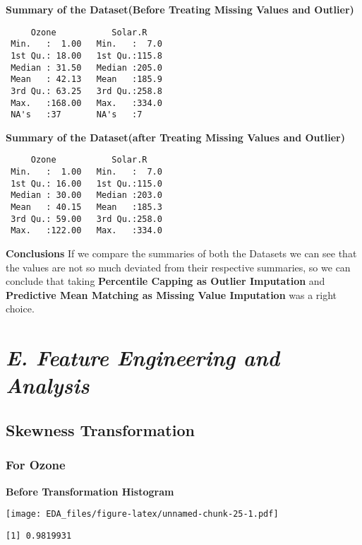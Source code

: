 \documentclass[12pt,]{article}
\begin{document}
\textbf{Summary of the Dataset(Before Treating Missing Values and
Outlier)}

\begin{verbatim}
     Ozone           Solar.R     
 Min.   :  1.00   Min.   :  7.0  
 1st Qu.: 18.00   1st Qu.:115.8  
 Median : 31.50   Median :205.0  
 Mean   : 42.13   Mean   :185.9  
 3rd Qu.: 63.25   3rd Qu.:258.8  
 Max.   :168.00   Max.   :334.0  
 NA's   :37       NA's   :7      
\end{verbatim}

\textbf{Summary of the Dataset(after Treating Missing Values and
Outlier)}

\begin{verbatim}
     Ozone           Solar.R     
 Min.   :  1.00   Min.   :  7.0  
 1st Qu.: 16.00   1st Qu.:115.0  
 Median : 30.00   Median :203.0  
 Mean   : 40.15   Mean   :185.3  
 3rd Qu.: 59.00   3rd Qu.:258.0  
 Max.   :122.00   Max.   :334.0  
\end{verbatim}

\textbf{Conclusions} If we compare the summaries of both the Datasets we
can see that the values are not so much deviated from their respective
summaries, so we can conclude that taking \textbf{Percentile Capping as
Outlier Imputation} and \textbf{Predictive Mean Matching as Missing
Value Imputation} was a right choice.

\section{\texorpdfstring{\emph{E. Feature Engineering and
Analysis}}{E. Feature Engineering and Analysis}}\label{e.-feature-engineering-and-analysis}

\subsection{\texorpdfstring{\textbf{Skewness
Transformation}}{Skewness Transformation}}\label{skewness-transformation}

\subsubsection{\texorpdfstring{\textbf{For
Ozone}}{For Ozone}}\label{for-ozone}

\textbf{Before Transformation Histogram}

\texttt{[image: EDA\_files/figure-latex/unnamed-chunk-25-1.pdf]}

\begin{verbatim}
[1] 0.9819931
\end{verbatim}
\end{document}
